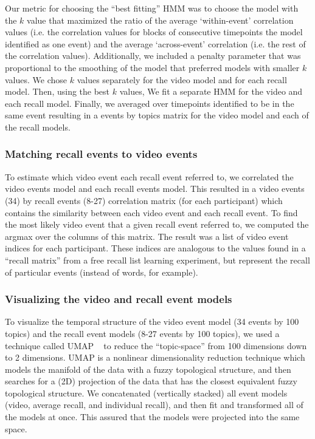 \documentclass{article}
\begin{document}
{Our metric for choosing the ``best fitting'' HMM was to choose the model with the $k$ value that maximized the ratio of the average `within-event' correlation values (i.e. the correlation values for blocks of consecutive timepoints the model identified as one event) and the average `across-event' correlation (i.e. the rest of the correlation values). Additionally, we included a penalty parameter that was proportional to the smoothing of the model that preferred models with smaller $k$ values. We chose $k$ values separately for the video model and for each recall model.  Then, using the best $k$ values, We fit a separate HMM for the video and each recall model. Finally, we averaged over timepoints identified to be in the same event resulting in a events by topics matrix for the video model and each of the recall models.

\subsubsection{Matching recall events to video events}
To estimate which video event each recall event referred to, we correlated the video events model and each recall events model. This resulted in a video events (34) by recall events (8-27) correlation matrix (for each participant) which contains the similarity between each video event and each recall event.  To find the most likely video event that a given recall event referred to, we computed the argmax over the columns of this matrix.  The result was a list of video event indices for each participant. These indices are analogous to the values found in a ``recall matrix'' from a free recall list learning experiment, but represent the recall of particular events (instead of words, for example).

\subsubsection{Visualizing the video and recall event models}
To visualize the temporal structure of the video event model (34 events by 100 topics) and the recall event models (8-27 events by 100 topics), we used a technique called UMAP ~\citep{McInHeal18} to reduce the ``topic-space'' from 100 dimensions down to 2 dimensions. UMAP is a nonlinear dimensionality reduction technique which models the manifold of the data with a fuzzy topological structure, and then searches for a (2D) projection of the data that has the closest equivalent fuzzy topological structure. We concatenated (vertically stacked) all event models (video, average recall, and individual recall), and then fit and transformed all of the models at once. This assured that the models were projected into the same space.

}
\end{document}
